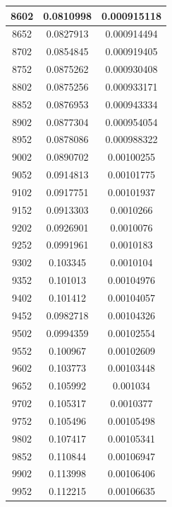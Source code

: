 \documentclass{article}
\begin{document}
\begin{longtable}{|c|c|c|}
		8602	&  0.0810998  	 &  0.000915118  \\ \hline                  
		8652	&  0.0827913  	 &  0.000914494  \\ \hline                  
		8702	&  0.0854845  	 &  0.000919405  \\ \hline                  
		8752	&  0.0875262  	 &  0.000930408  \\ \hline                  
		8802	&  0.0875256  	 &  0.000933171  \\ \hline                  
		8852	&  0.0876953  	 &  0.000943334  \\ \hline                  
		8902	&  0.0877304  	 &  0.000954054  \\ \hline                  
		8952	&  0.0878086  	 &  0.000988322  \\ \hline                  
		9002	&  0.0890702  	 &  0.00100255   \\ \hline                 
		9052	&  0.0914813  	 &  0.00101775   \\ \hline                 
		9102	&  0.0917751  	 &  0.00101937   \\ \hline                 
		9152	&  0.0913303  	 &  0.0010266    \\ \hline                
		9202	&  0.0926901  	 &  0.0010076    \\ \hline                
		9252	&  0.0991961  	 &  0.0010183    \\ \hline                
		9302	&  0.103345   	 &  0.0010104    \\ \hline                
		9352	&  0.101013   	 &  0.00104976   \\ \hline                 
		9402	&  0.101412   	 &  0.00104057   \\ \hline                 
		9452	&  0.0982718  	 &  0.00104326   \\ \hline                 
		9502	&  0.0994359  	 &  0.00102554   \\ \hline                 
		9552	&  0.100967   	 &  0.00102609   \\ \hline                 
		9602	&  0.103773   	 &  0.00103448   \\ \hline                 
		9652	&  0.105992   	 &  0.001034     \\ \hline               
		9702	&  0.105317   	 &  0.0010377    \\ \hline                
		9752	&  0.105496   	 &  0.00105498   \\ \hline                 
		9802	&  0.107417   	 &  0.00105341   \\ \hline                 
		9852	&  0.110844   	 &  0.00106947   \\ \hline                 
		9902	&  0.113998   	 &  0.00106406   \\ \hline                 
		9952	&  0.112215   	 &  0.00106635   \\ \hline     
	\end{longtable}
\end{document}
